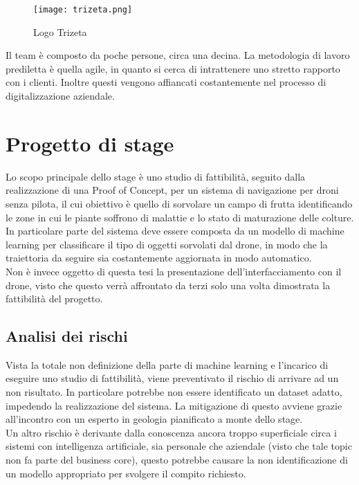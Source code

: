 \begin{figure}[!h]
	\centering 
	\texttt{[image: trizeta.png]}
	\caption{Logo Trizeta}
\end{figure}

Il team è composto da poche persone, circa una decina. La metodologia di lavoro prediletta è quella agile, in quanto si cerca di intrattenere uno
stretto rapporto con i clienti. Inoltre questi vengono affiancati costantemente nel processo di digitalizzazione aziendale.

\section{Progetto di stage}

Lo scopo principale dello stage è uno studio di fattibilità, seguito dalla realizzazione di una Proof of Concept, per un sistema di navigazione
per droni senza pilota, il cui obiettivo è quello di sorvolare un campo di frutta identificando le zone in cui le piante soffrono di malattie e lo stato
di maturazione delle colture.\\
In particolare parte del sistema deve essere composta da un modello di machine learning per classificare il tipo di oggetti sorvolati dal drone,
in modo che la traiettoria da seguire sia costantemente aggiornata in modo automatico.\\
Non è invece oggetto di questa tesi la presentazione dell'interfacciamento con il drone, visto che questo verrà affrontato da terzi solo una volta dimostrata
la fattibilità del progetto.

\subsection{Analisi dei rischi}
Vista la totale non definizione della parte di machine learning e l'incarico di eseguire uno studio di fattibilità, viene preventivato il rischio di arrivare ad un non risultato.
In particolare potrebbe non essere identificato un dataset adatto, impedendo la realizzazione del sistema. La mitigazione di questo avviene grazie
all'incontro con un esperto in geologia pianificato a monte dello stage.\\
Un altro rischio è derivante dalla conoscenza ancora troppo superficiale circa i sistemi con intelligenza artificiale, sia personale che aziendale (visto che tale
topic non fa parte del business core), questo potrebbe causare la non identificazione di un modello appropriato per svolgere il compito richiesto.

